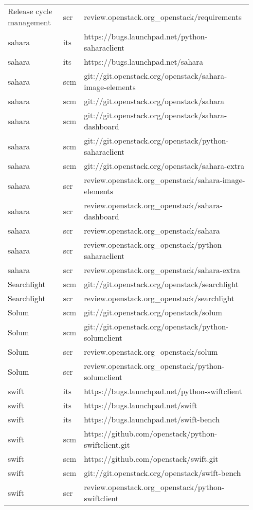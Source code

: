 \begin{center}
\begin{longtable}{|p{4cm}|p{1cm}|p{10cm}|}
Release cycle management&scr&review.openstack.org\_openstack/requirements\\ 
sahara&its&https://bugs.launchpad.net/python-saharaclient\\ 
sahara&its&https://bugs.launchpad.net/sahara\\ 
sahara&scm&git://git.openstack.org/openstack/sahara-image-elements\\ 
sahara&scm&git://git.openstack.org/openstack/sahara\\ 
sahara&scm&git://git.openstack.org/openstack/sahara-dashboard\\ 
sahara&scm&git://git.openstack.org/openstack/python-saharaclient\\ 
sahara&scm&git://git.openstack.org/openstack/sahara-extra\\ 
sahara&scr&review.openstack.org\_openstack/sahara-image-elements\\ 
sahara&scr&review.openstack.org\_openstack/sahara-dashboard\\ 
sahara&scr&review.openstack.org\_openstack/sahara\\ 
sahara&scr&review.openstack.org\_openstack/python-saharaclient\\ 
sahara&scr&review.openstack.org\_openstack/sahara-extra\\ 
Searchlight&scm&git://git.openstack.org/openstack/searchlight\\ 
Searchlight&scr&review.openstack.org\_openstack/searchlight\\ 
Solum&scm&git://git.openstack.org/openstack/solum\\ 
Solum&scm&git://git.openstack.org/openstack/python-solumclient\\ 
Solum&scr&review.openstack.org\_openstack/solum\\ 
Solum&scr&review.openstack.org\_openstack/python-solumclient\\ 
swift&its&https://bugs.launchpad.net/python-swiftclient\\ 
swift&its&https://bugs.launchpad.net/swift\\ 
swift&its&https://bugs.launchpad.net/swift-bench\\ 
swift&scm&https://github.com/openstack/python-swiftclient.git\\ 
swift&scm&https://github.com/openstack/swift.git\\ 
swift&scm&git://git.openstack.org/openstack/swift-bench\\ 
swift&scr&review.openstack.org\_openstack/python-swiftclient\\ 

\end{longtable}
\end{center}
